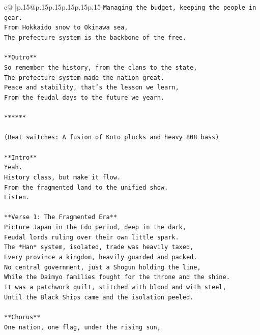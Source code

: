 \documentclass{article}
\begin{document}
{\begin{supertabular}{c@{$\;$}|p{.15\linewidth}@{}p{.15\linewidth}p{.15\linewidth}p{.15\linewidth}p{.15\linewidth}p{.15\linewidth}}
{{{\texttt{Managing the budget, keeping the people in gear.} \\
\texttt{From Hokkaido snow to Okinawa sea,} \\
\texttt{The prefecture system is the backbone of the free.} \\
\\ 
\texttt{**Outro**} \\
\texttt{So remember the history, from the clans to the state,} \\
\texttt{The prefecture system made the nation great.} \\
\texttt{Peace and stability, that's the lesson we learn,} \\
\texttt{From the feudal days to the future we yearn.} \\
\\ 
\texttt{******} \\
\\ 
\texttt{(Beat switches: A fusion of Koto plucks and heavy 808 bass)} \\
\\ 
\texttt{**Intro**} \\
\texttt{Yeah.} \\
\texttt{History class, but make it flow.} \\
\texttt{From the fragmented land to the unified show.} \\
\texttt{Listen.} \\
\\ 
\texttt{**Verse 1: The Fragmented Era**} \\
\texttt{Picture Japan in the Edo period, deep in the dark,} \\
\texttt{Feudal lords ruling over their own little spark.} \\
\texttt{The *Han* system, isolated, trade was heavily taxed,} \\
\texttt{Every province a kingdom, heavily guarded and packed.} \\
\texttt{No central government, just a Shogun holding the line,} \\
\texttt{While the Daimyo families fought for the throne and the shine.} \\
\texttt{It was a patchwork quilt, stitched with blood and with steel,} \\
\texttt{Until the Black Ships came and the isolation peeled.} \\
\\ 
\texttt{**Chorus**} \\
\texttt{One nation, one flag, under the rising sun,} \\
}}}
\end{supertabular}}
\end{document}
